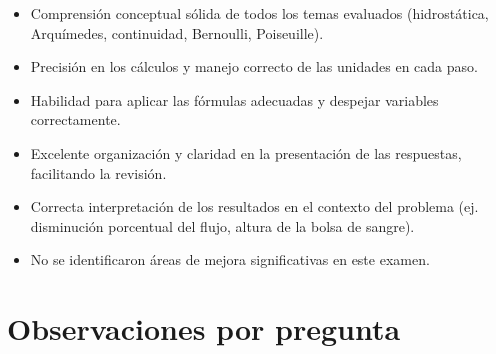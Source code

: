 \documentclass[11pt,a4paper]{article}
\begin{document}
\vspace{4pt}
\begin{minipage}[t]{0.48\linewidth}
  \begin{tcolorbox}[cajaFortaleza, title={Fortalezas}]
\begin{itemize}[leftmargin=1.5em, itemsep=2pt]
  \item Comprensión conceptual sólida de todos los temas evaluados (hidrostática, Arquímedes, continuidad, Bernoulli, Poiseuille).
  \item Precisión en los cálculos y manejo correcto de las unidades en cada paso.
  \item Habilidad para aplicar las fórmulas adecuadas y despejar variables correctamente.
  \item Excelente organización y claridad en la presentación de las respuestas, facilitando la revisión.
  \item Correcta interpretación de los resultados en el contexto del problema (ej. disminución porcentual del flujo, altura de la bolsa de sangre).
\end{itemize}
  \end{tcolorbox}
\end{minipage}
\hfill
\begin{minipage}[t]{0.48\linewidth}
  \begin{tcolorbox}[cajaMejora, title={Areas de mejora}]
\begin{itemize}[leftmargin=1.5em, itemsep=2pt]
  \item No se identificaron áreas de mejora significativas en este examen.
\end{itemize}
  \end{tcolorbox}
\end{minipage}

\section*{Observaciones por pregunta}
\end{document}
